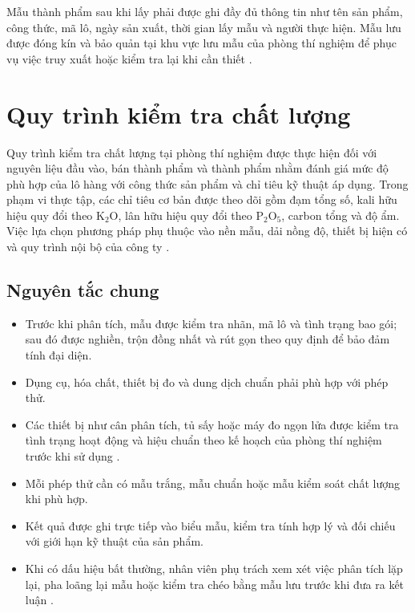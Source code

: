Mẫu thành phẩm sau khi lấy phải được ghi đầy đủ thông tin như tên sản phẩm, công thức, mã lô, ngày sản xuất, thời gian lấy mẫu và người thực hiện. 
Mẫu lưu được đóng kín và bảo quản tại khu vực lưu mẫu của phòng thí nghiệm để phục vụ việc truy xuất hoặc kiểm tra lại khi cần thiết \cite{company-internal-documents}.





\section{Quy trình kiểm tra chất lượng}
Quy trình kiểm tra chất lượng tại phòng thí nghiệm được thực hiện đối với nguyên liệu đầu vào, bán thành phẩm và thành phẩm nhằm đánh giá mức độ phù hợp của lô hàng với công thức sản phẩm và chỉ tiêu kỹ thuật áp dụng. 
Trong phạm vi thực tập, các chỉ tiêu cơ bản được theo dõi gồm đạm tổng số, kali hữu hiệu quy đổi theo \(\mathrm{K_2O}\), lân hữu hiệu quy đổi theo \(\mathrm{P_2O_5}\), carbon tổng và độ ẩm. Việc lựa chọn phương pháp phụ thuộc vào nền mẫu, dải nồng độ, thiết bị hiện có và quy trình nội bộ của công ty \cite{company-internal-documents,qcvn-fertilizer-quality}.

\subsection{Nguyên tắc chung}
\begin{itemize}
  \item Trước khi phân tích, mẫu được kiểm tra nhãn, mã lô và tình trạng bao gói; sau đó được nghiền, trộn đồng nhất và rút gọn theo quy định để bảo đảm tính đại diện. 
  \item Dụng cụ, hóa chất, thiết bị đo và dung dịch chuẩn phải phù hợp với phép thử. 
  \item Các thiết bị như cân phân tích, tủ sấy hoặc máy đo ngọn lửa được kiểm tra tình trạng hoạt động và hiệu chuẩn theo kế hoạch của phòng thí nghiệm trước khi sử dụng \cite{company-internal-documents}.
  \item Mỗi phép thử cần có mẫu trắng, mẫu chuẩn hoặc mẫu kiểm soát chất lượng khi phù hợp. 
  \item Kết quả được ghi trực tiếp vào biểu mẫu, kiểm tra tính hợp lý và đối chiếu với giới hạn kỹ thuật của sản phẩm. 
  \item Khi có dấu hiệu bất thường, nhân viên phụ trách xem xét việc phân tích lặp lại, pha loãng lại mẫu hoặc kiểm tra chéo bằng mẫu lưu trước khi đưa ra kết luận \cite{company-internal-documents}.
\end{itemize}

